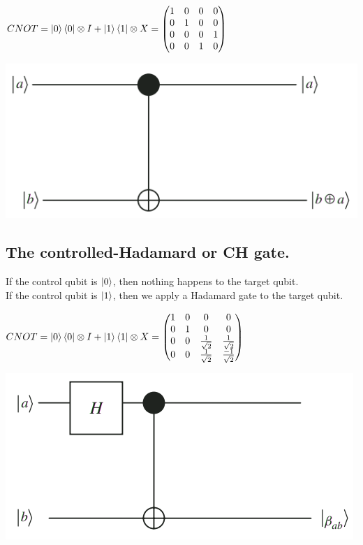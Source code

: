 \documentclass[12pt,oneside]{book}
\begin{document}
\begin{minipage}{0.6\linewidth}
    $CNOT = \ket{0}\bra{0}\otimes I + \ket{1}\bra{1}\otimes X =  \left( \begin{matrix}
        1&  0&  0&  0  \\ 
        0&  1&  0&  0  \\ 
        0&  0&  0&  1  \\ 
        0&  0&  1&  0  \\ 
       \end{matrix}\right)$
\end{minipage}
\begin{minipage}{0.3\linewidth}
    \includegraphics[width=\linewidth]{../pic/3327/4}
\end{minipage}
\subsection{The controlled-Hadamard or CH gate.}
If the control qubit is $\ket{0}$, then nothing happens to the target qubit.\\
If the control qubit is $\ket{1}$, then we apply a Hadamard gate to the target qubit.\\

\begin{minipage}{0.6\linewidth}
    $CNOT = \ket{0}\bra{0}\otimes I + \ket{1}\bra{1}\otimes X =  \left( \begin{matrix}
        1&  0&  0&  0  \\ 
        0&  1&  0&  0  \\ 
        0&  0&  \frac{1}{\sqrt{2}}&  \frac{1}{\sqrt{2}}  \\ 
        0&  0&  \frac{1}{\sqrt{2}}&  \frac{-1}{\sqrt{2}}  \\ 
       \end{matrix}\right)$
\end{minipage}
\begin{minipage}{0.3\linewidth}
    \includegraphics[width=\linewidth]{../pic/3327/5}
\end{minipage}
\end{document}
